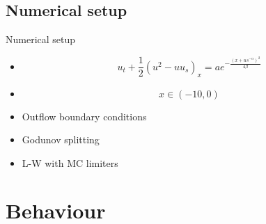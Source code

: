 \documentclass{beamer}
\begin{document}
\subsection{Numerical setup}
\begin{frame}{Numerical setup}
	\begin{itemize}
		\item \[u_t +\frac{1}{2}(u^2-uu_s)_x =a e^{-\frac{(x+us^{-\alpha})^2}{4\beta}} \]
		\item \[x\in (-10,0)\]
		\item Outflow boundary conditions
		\item Godunov splitting
		\item L-W with MC limiters 
	\end{itemize}
    
	
\end{frame}	


\section{Behaviour}
\end{document}
